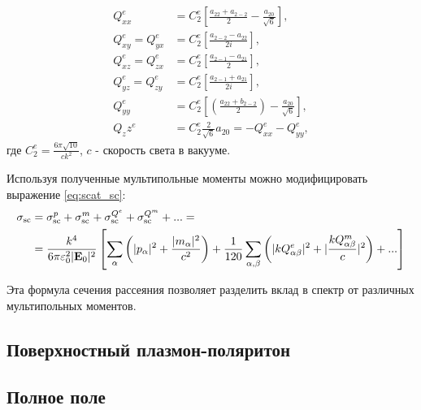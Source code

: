 \begin{align*}
    Q_{xx}^e &= C_2^e \left[ \frac{a_{22}+a_{2-2}}{2} - \frac{a_{20}}{\sqrt{6}} \right], \\
    Q_{xy}^e = Q_{yx}^e &= C_2^e \left[ \frac{a_{2-2}-a_{22}}{2 i} \right], \\
    Q_{xz}^e = Q_{zx}^e &= C_2^e \left[ \frac{a_{2-1}-a_{21}}{2}  \right],\\
    Q_{yz}^e = Q_{zy}^e &= C_2^e \left[ \frac{a_{2-1}+a_{21}}{2i} \right],\\
    Q_{yy}^e &= C_2^e \left[ \left( \frac{a_{22}+b_{2-2}}{2} \right)  -\frac{a_{20}}{\sqrt{6}}\right],\\
    Q_zz^e &= C_2^e \frac{2 }{\sqrt{6}} a_{20} = -Q_{xx}^e -Q_{yy}^e,
\end{align*}
где $C_2^e = \frac{6 \pi \sqrt{10}}{c k^2}$, $c$ - скорость света в вакууме. 

Используя полученные мультипольные моменты можно модифицировать выражение \eqref{eq:scat_sc}:
\begin{align*}
    \sigma_{\text{sc}} &= \sigma_{\text{sc}}^p + \sigma_{\text{sc}}^m + \sigma_{\text{sc}}^{Q^e} +
    \sigma_{\text{sc}}^{Q^m} + ... = \\ &= \frac{k^4}{6 \pi \varepsilon_0^2 |\vb{E}_0|^2 } \left[ \sum_{\alpha}\left( |p_{\alpha}|^2 + 
    \frac{| m_{\alpha}|^2}{c^2} \right) + \frac{1}{120} \sum_{\alpha,\beta} \left( |k Q_{\alpha \beta}^e|^2 + |\frac{k Q_{\alpha \beta}^m}{c}|^2 \right) + ...\right]
\end{align*}

Эта формула сечения рассеяния позволяет разделить вклад в спектр от различных мультипольных моментов. 

\subsection{Поверхностный плазмон-поляритон}\label{subsec:spp}

\subsection{Полное поле}\label{subsec:full_field}







